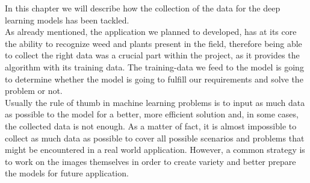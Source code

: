 \documentclass[english]{lni}
\begin{document}
In this chapter we will describe how the collection of the data for the deep learning models has been tackled.\\
As already mentioned, the application we planned to developed, has at its core the ability to recognize weed and plants present in the field, therefore being able to collect the right data was a crucial part within the project, as it provides the algorithm with its training data. The training-data we feed to the model is going to determine whether the model is going to fulfill our requirements and solve the problem or not. \\
Usually the rule of thumb in machine learning problems is to input as much data as possible to the model for a better, more efficient solution and, in some cases, the collected data is not enough. As a matter of fact, it is almost impossible to collect as much data as possible to cover all possible scenarios and problems that might be encountered in a real world application. However, a common strategy is to work on the images themselves in order to create variety and better prepare the models for future application.\\
\hfill
\end{document}
